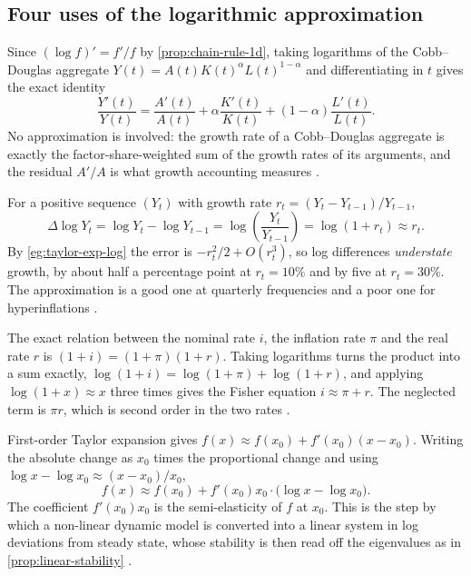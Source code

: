 \subsection{Four uses of the logarithmic approximation}

\begin{eg}\label{eg:growth-accounting}
	Since $(\log f)'=f'/f$ by \autoref{prop:chain-rule-1d}, taking logarithms of
	the Cobb--Douglas aggregate $Y(t)=A(t)K(t)^\alpha L(t)^{1-\alpha}$ and
	differentiating in $t$ gives the exact identity
	\[
		\frac{Y'(t)}{Y(t)}=\frac{A'(t)}{A(t)}+\alpha\frac{K'(t)}{K(t)}
		+(1-\alpha)\frac{L'(t)}{L(t)} .
	\]
	No approximation is involved: the growth rate of a Cobb--Douglas aggregate is
	exactly the factor-share-weighted sum of the growth rates of its arguments, and
	the residual $A'/A$ is what growth accounting measures
	\autocite[slide 37]{fukuda2026calculus}.
\end{eg}

\begin{eg}\label{eg:log-growth}
	For a positive sequence $(Y_t)$ with growth rate
	$r_t=(Y_t-Y_{t-1})/Y_{t-1}$,
	\[
		\Delta\log Y_t=\log Y_t-\log Y_{t-1}=\log\!\left(\frac{Y_t}{Y_{t-1}}\right)
		=\log(1+r_t)\approx r_t .
	\]
	By \autoref{eg:taylor-exp-log} the error is $-r_t^2/2+O(r_t^3)$, so log
	differences \emph{understate} growth, by about half a percentage point at
	$r_t=10\%$ and by five at $r_t=30\%$. The approximation is a good one at
	quarterly frequencies and a poor one for hyperinflations
	\autocite[slide 38]{fukuda2026calculus}.
\end{eg}

\begin{eg}\label{eg:fisher}
	The exact relation between the nominal rate $i$, the inflation rate $\pi$ and
	the real rate $r$ is $(1+i)=(1+\pi)(1+r)$. Taking logarithms turns the product
	into a sum exactly, $\log(1+i)=\log(1+\pi)+\log(1+r)$, and applying
	$\log(1+x)\approx x$ three times gives the Fisher equation
	$i\approx\pi+r$. The neglected term is $\pi r$, which is second order in the two
	rates \autocite[slide 39]{fukuda2026calculus}.
\end{eg}

\begin{eg}\label{eg:log-linearization}
	First-order Taylor expansion gives
	$f(x)\approx f(x_0)+f'(x_0)(x-x_0)$. Writing the absolute change as $x_0$ times
	the proportional change and using $\log x-\log x_0\approx(x-x_0)/x_0$,
	\[
		f(x)\approx f(x_0)+f'(x_0)x_0\cdot\bigl(\log x-\log x_0\bigr).
	\]
	The coefficient $f'(x_0)x_0$ is the semi-elasticity of $f$ at $x_0$. This is the
	step by which a non-linear dynamic model is converted into a linear system in log
	deviations from steady state, whose stability is then read off the eigenvalues
	as in \autoref{prop:linear-stability} \autocite[slide 40]{fukuda2026calculus}.
\end{eg}

